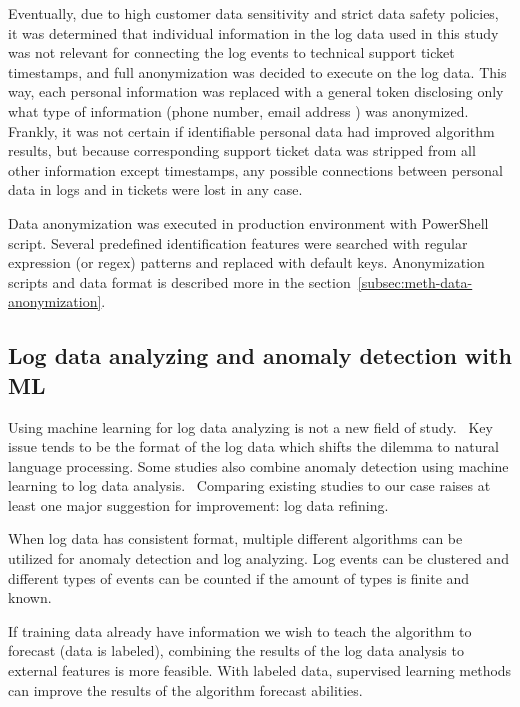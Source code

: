 Eventually,
due to high customer data sensitivity and strict data safety policies,
it was determined that individual information in the log data used in this study
was not relevant for connecting the log events to technical support ticket timestamps,
and full anonymization was decided to execute on the log data.
This way,
each personal information was replaced with a general token
disclosing only what type of information (phone number, email address \etc) was anonymized.
Frankly,
it was not certain if identifiable personal data had improved algorithm results,
but because corresponding support ticket data
was stripped from all other information except timestamps,
any possible connections between personal data in logs and in tickets
were lost in any case.

Data anonymization was executed in production environment
with PowerShell script.
Several predefined identification features were searched with
regular expression (or regex) patterns and replaced with
default keys.
Anonymization scripts and data format
is described more in the section~\ref{subsec:meth-data-anonymization}.



\subsection{Log data analyzing and anomaly detection with ML}\label{subsec:bg-log-data-analyzing-and-anomaly-detection-with-ml}

Using machine learning for log data analyzing
is not a new field of study.~\cite{rantala2019applying,allagi2019analysis,kondo2017early,cao2017machine}
Key issue tends to be the format of the log data
which shifts the dilemma to natural language processing.
Some studies also combine anomaly detection using machine learning
to log data analysis.~\cite{liu2019loganomaly, zhang2019robust}
Comparing existing studies to our case
raises at least one major suggestion for improvement:
log data refining.

When log data has consistent format,
multiple different algorithms can be utilized
for anomaly detection and log analyzing.
Log events can be clustered
and different types of events can be counted
if the amount of types is finite and known.~\cite{liu2019loganomaly}

If training data already have information
we wish to teach the algorithm to forecast (\ie data is labeled),
combining the results of the log data analysis to external features
is more feasible.
With labeled data,
supervised learning methods can improve the results of the algorithm forecast abilities.
~\cite{rantala2019applying}

